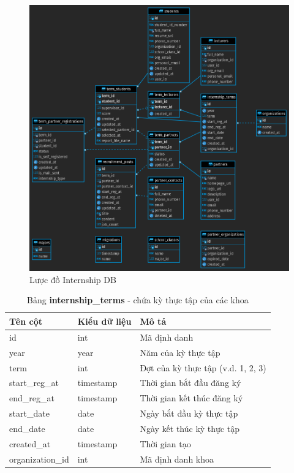 \documentclass[./../main.tex]{subfiles}
\begin{document}
\begin{figure}
	\includegraphics[width=\linewidth]{./images/image1.png}
	\caption{Lược đồ Internship DB}
	\label{fig:internship_db_design}
\end{figure}

\begin{table}[H]
	\caption[Bảng internship\_terms]{Bảng \textbf{internship\_terms} - chứa kỳ thực tập của các khoa}
	\label{tab:db_terms}
	\begin{tabular}{|l|l|l|}
		\hline
		\textbf{Tên cột} & \textbf{Kiểu dữ liệu} & \textbf{Mô tả}                     \\ \hline
		id               & int                   & Mã định danh                       \\ \hline
		year             & year                  & Năm của kỳ thực tập                \\ \hline
		term             & int                   & Đợt của kỳ thực tập (v.d. 1, 2, 3) \\ \hline
		start\_reg\_at   & timestamp             & Thời gian bắt đầu đăng ký          \\ \hline
		end\_reg\_at     & timestamp             & Thời gian kết thúc đăng ký         \\ \hline
		start\_date      & date                  & Ngày bắt đầu kỳ thực tập           \\ \hline
		end\_date        & date                  & Ngày kết thúc kỳ thực tập          \\ \hline
		created\_at      & timestamp             & Thời gian tạo                      \\ \hline
		organization\_id & int                   & Mã định danh khoa                  \\ \hline
	\end{tabular}
\end{table}
\end{document}
